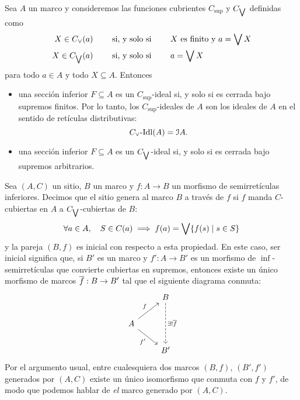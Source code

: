 \begin{example}
    Sea $A$ un marco y consideremos las funciones cubrientes
    $C_\sup$ y $C_{\bigvee}$ definidas como
    \begin{align*}
        X\in C_\vee(a)
        &\qquad\text{ si, y solo si }\qquad
        \text{$X$ es finito y } a=\bigvee X \\
        X\in C_{\bigvee}(a)
        &\qquad\text{ si, y solo si }\qquad
        a=\bigvee X 
    \end{align*}
    para todo $a\in A$ y todo $X\subseteq A$.
    Entonces
    \begin{itemize}
        \item
        una sección inferior $F\subseteq A$ es un
        $C_\sup$-ideal si, y solo si es cerrada bajo supremos
        finitos.
        Por lo tanto, los $C_\sup$-ideales de $A$
        son los ideales de $A$ en el sentido de retículas
        distributivas:
        \[
            C_\vee\text{-}\mathrm{Idl}(A) = \mathcal{I} A.
        \]
        \item
        una sección inferior $F\subseteq A$ es un
        $C_{\bigvee}$-ideal si, y solo si es cerrada bajo supremos
        arbitrarios.
    \end{itemize}
\end{example}

\begin{definition}
    Sea $(A,C)$ un sitio, $B$ un marco y $f:A\to B$ un morfismo de
    semirretículas inferiores. Decimos que el sitio genera al marco
    $B$ a través de $f$ si $f$ manda $C$-cubiertas en $A$ a
    $C_{\bigvee}$-cubiertas de $B$:
    \begin{equation*}
      \forall a\in A,\quad
        S\in C(a) \implies f(a) = \bigvee\{f(s)\mid s\in S\}
    \end{equation*}
    y la pareja $(B,f)$ es inicial con respecto a esta propiedad.
    En este caso, ser inicial significa que,
    si $B'$ es un marco y $f':A\to B'$ es un morfismo
    de $\inf$-semirretículas
    que convierte cubiertas en supremos,
    entonces existe un único morfismo de marcos
    $\overline{f}:B\to B'$ tal que el siguiente diagrama conmuta:
    \[
        \begin{tikzcd}[ampersand replacement=\&]
            \& B \arrow[dd, "\exists!\overline{f}", dashed] \\
            A \arrow[ru, "f"] \arrow[rd, "f'"'] \& \\
            \& B'                                          
        \end{tikzcd}
    \]
    Por el argumento usual, entre cualesquiera dos
    marcos $(B,f)$, $(B',f')$ generados por $(A,C)$ existe un único
    isomorfismo que conmuta con $f$ y $f'$,
    de modo que podemos hablar de \emph{el} marco generado
    por $(A,C)$.
\end{definition}

